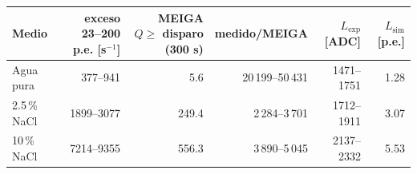 \begin{tabular}{lrrrrr}
\toprule
Medio & exceso 23--200 p.e. [s$^{-1}$] & MEIGA $Q\geq$ disparo (300 s) & medido/MEIGA & $L_\text{exp}$ [ADC] & $L_\text{sim}$ [p.e.] \\
\midrule
Agua pura & 377--941 & 5.6 & 20\,199--50\,431 & 1471--1751 & 1.28 \\
2.5\,\% NaCl & 1899--3077 & 249.4 & 2\,284--3\,701 & 1712--1911 & 3.07 \\
10\,\% NaCl & 7214--9355 & 556.3 & 3\,890--5\,045 & 2137--2332 & 5.53 \\
\bottomrule
\end{tabular}

